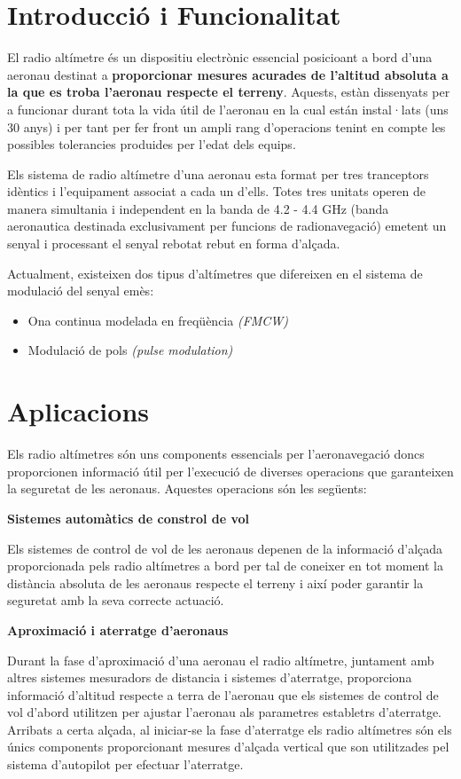 \section{Introducció i Funcionalitat}

El radio altímetre és un dispositiu electrònic essencial posicioant a bord d'una aeronau destinat a \textbf{proporcionar mesures acurades de l'altitud absoluta a la que es troba l'aeronau respecte el terreny}. 
Aquests, estàn dissenyats per a funcionar durant tota la vida útil de l'aeronau en la cual están instal·lats (uns 30 anys) i per tant per fer front un ampli rang d'operacions tenint en compte les possibles tolerancies produides per l'edat dels equips.

Els sistema de radio altímetre d'una aeronau esta format per tres tranceptors idèntics i l'equipament associat a cada un d'ells. Totes tres unitats operen de manera simultania i independent en la banda de 4.2 - 4.4 GHz (banda aeronautica destinada exclusivament per funcions de radionavegació) emetent un senyal i processant el senyal rebotat rebut en forma d'alçada.

Actualment, existeixen dos tipus d'altímetres que difereixen en el sistema de modulació del senyal emès: 
\begin{itemize}
\item Ona continua modelada en freqüència \textit{(FMCW)}
\item Modulació de pols \textit{(pulse modulation)}
\end{itemize}


\section{Aplicacions}

Els radio altímetres són uns components essencials per l'aeronavegació doncs proporcionen informació útil per l'execució de diverses operacions que garanteixen la seguretat de les aeronaus. Aquestes operacions són les següents:

\textbf{Sistemes automàtics de constrol de vol}

Els sistemes de control de vol de les aeronaus depenen de la informació d'alçada proporcionada pels radio altímetres a bord per tal de coneixer en tot moment la distància absoluta de les aeronaus respecte el terreny i així poder garantir la seguretat amb la seva correcte actuació.

\textbf{Aproximació i aterratge d'aeronaus}

Durant la fase d'aproximació d'una aeronau el radio altímetre, juntament amb altres sistemes mesuradors de distancia i sistemes d'aterratge, proporciona informació d'altitud respecte a terra de l'aeronau que els sistemes de control de vol d'abord utilitzen per ajustar l'aeronau als parametres establetrs d'aterratge. Arribats a certa alçada, al iniciar-se la fase d'aterratge els radio altímetres són els únics components proporcionant mesures d'alçada vertical que son utilitzades pel sistema d'autopilot per efectuar l'aterratge.  

